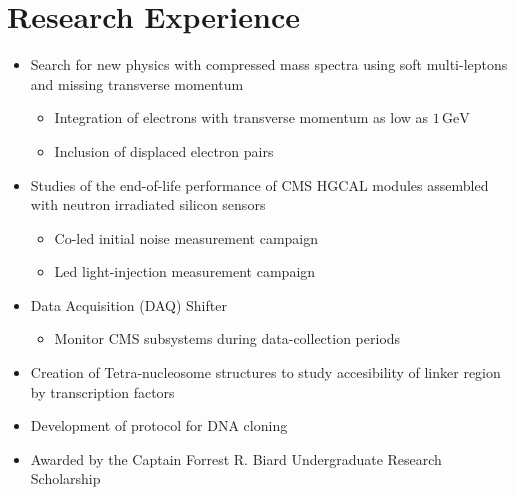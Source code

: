 \documentclass[a4paper, twoside, english, 12pt]{article}
\begin{document}
\section*{Research Experience}
\vspace{-\topsep}
\begin{itemize}
    \setlength{\parskip}{0pt}
    \setlength{\itemsep}{0pt plus 1pt}
    \item Search for new physics with compressed mass spectra using soft multi-leptons and missing transverse momentum
        \begin{itemize}
            \setlength{\parskip}{0pt}
            \setlength{\itemsep}{0pt plus 1pt}
            \item Integration of electrons with transverse momentum as low as $1\,\text{GeV}$
            \item Inclusion of displaced electron pairs
        \end{itemize}
    \item Studies of the end-of-life performance of CMS HGCAL modules assembled with neutron irradiated silicon sensors
        \begin{itemize}
            \setlength{\parskip}{0pt}
            \setlength{\itemsep}{0pt plus 1pt}
            \item Co-led initial noise measurement campaign
            \item Led light-injection measurement campaign
        \end{itemize}
    \item Data Acquisition (DAQ) Shifter
        \begin{itemize}
            \setlength{\parskip}{0pt}
            \setlength{\itemsep}{0pt plus 1pt}
            \item Monitor CMS subsystems during data-collection periods
        \end{itemize}
\end{itemize}%
%
\vspace{-\topsep}
\begin{itemize}
    \setlength{\parskip}{0pt}
    \setlength{\itemsep}{0pt plus 1pt}
    \item Creation of Tetra-nucleosome structures to study accesibility of linker region by transcription factors
    \item Development of protocol for DNA cloning
    \item Awarded by the Captain Forrest R. Biard Undergraduate Research Scholarship
\end{itemize}%
\end{document}
